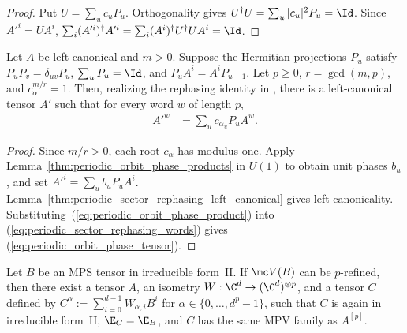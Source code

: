 \begin{proof}\leanok
    Put $U=\sum_uc_uP_u$. Orthogonality gives
    $U^\dagger U=\sum_u|c_u|^2P_u=\Id$. Since $A'^i=UA^i$,
    $\sum_i(A'^i)^\dagger A'^i=\sum_i(A^i)^\dagger U^\dagger UA^i=\Id$.
\end{proof}

\begin{lemma}
    \label{thm:periodic_orbit_phase_tensor}
    \leanok
    Let $A$ be left canonical and $m>0$. Suppose the Hermitian projections
    $P_u$ satisfy $P_uP_v=\delta_{uv}P_u$, $\sum_uP_u=\Id$, and
    $P_uA^i=A^iP_{u+1}$. Let $p\ge0$, $r=\gcd(m,p)$, and
    $c_\alpha^{m/r}=1$. Then, realizing the rephasing identity in
    \cite[proof of Theorem~4.1]{DeLasCuevas2017Irreducible}, there is a
    left-canonical tensor $A'$ such that for every word $w$ of length $p$,
    \begin{align}
        A'^w & = \sum_u c_{\alpha_u}P_uA^w.
        \label{eq:periodic_orbit_phase_tensor}
    \end{align}
\end{lemma}

\begin{proof}\leanok
    Since $m/r>0$, each root $c_\alpha$ has modulus one. Apply
    Lemma~\ref{thm:periodic_orbit_phase_products} in $U(1)$ to obtain
    unit phases $b_u$, and set $A'^i=\sum_ub_uP_uA^i$.
    Lemma~\ref{thm:periodic_sector_rephasing_left_canonical} gives left
    canonicality. Substituting~(\ref{eq:periodic_orbit_phase_product}) into
    (\ref{eq:periodic_sector_rephasing_words}) gives
    (\ref{eq:periodic_orbit_phase_tensor}).
\end{proof}

\begin{lemma}
    \label{thm:p_refinement_pullback_irreducible_form}
    \leanok
    Let $B$ be an MPS tensor in irreducible form~II. If $\mc V(B)$ can be
    $p$-refined, then there exist a tensor $A$, an isometry
    $W : \C^d \to (\C^d)^{\otimes p}$, and a tensor $C$ defined by
    $C^\alpha := \sum_{i=0}^{d-1} W_{\alpha,i}B^i$ for
    $\alpha \in \{0,\ldots,d^p-1\}$,
    such that $C$ is again in irreducible form~II, $\E_C = \E_B$,
    and $C$ has the same MPV family as $A^{[p]}$.
\end{lemma}

